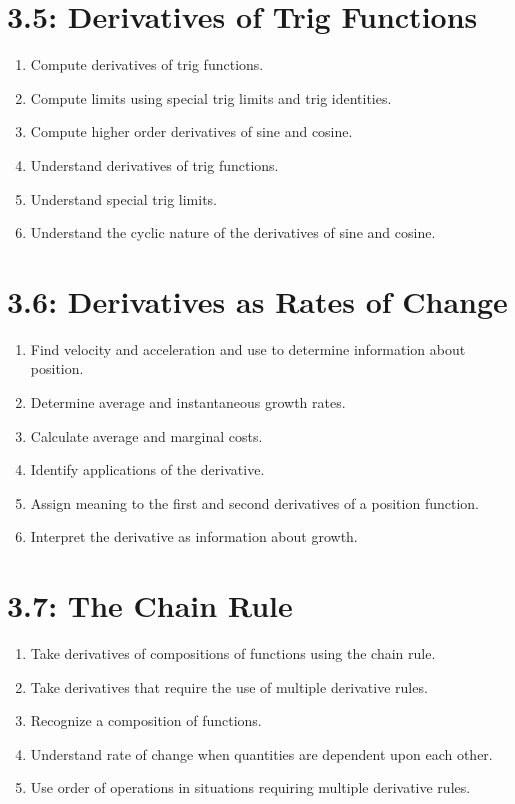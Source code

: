 \documentclass[11pt]{article}
\begin{document}
\section*{3.5: Derivatives of Trig Functions}
\begin{enumerate}
	\item Compute derivatives of trig functions.
	\item Compute limits using special trig limits and trig identities.
	\item Compute higher order derivatives of sine and cosine.
	\item Understand derivatives of trig functions.
	\item Understand special trig limits.
	\item Understand the cyclic nature of the derivatives of sine and cosine.
\end{enumerate}

\section*{3.6: Derivatives as Rates of Change}
\begin{enumerate}
	\item Find velocity and acceleration and use to determine information about position.
	\item Determine average and instantaneous growth rates.
	\item Calculate average and marginal costs.
	\item Identify applications of the derivative.
	\item Assign meaning to the first and second derivatives of a position function.
	\item Interpret the derivative as information about growth.
\end{enumerate}

\section*{3.7: The Chain Rule}
\begin{enumerate}
	\item Take derivatives of compositions of functions using the chain rule.
	\item Take derivatives that require the use of multiple derivative rules.
	\item Recognize a composition of functions.
	\item Understand rate of change when quantities are dependent upon each other.
	\item Use order of operations in situations requiring multiple derivative rules.
\end{enumerate}
\end{document}
